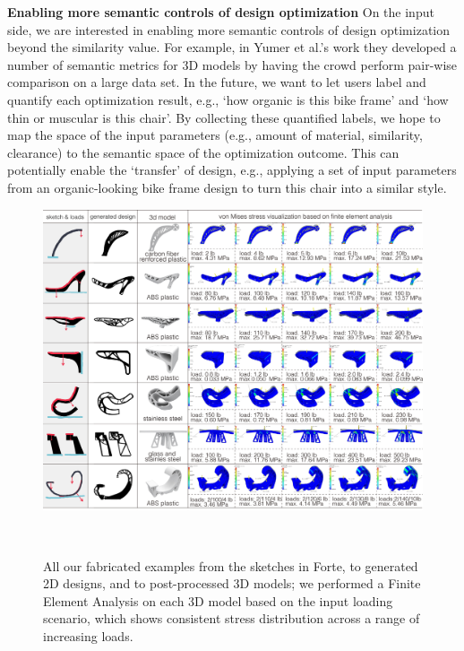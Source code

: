 \textbf{Enabling more semantic controls of design optimization}
On the input side, we are interested in enabling more semantic controls of design optimization beyond the similarity value. For example, in Yumer et al.'s work \cite{yumer2015semantic} they developed a number of semantic metrics for 3D models by having the crowd perform pair-wise comparison on a large data set. In the future, we want to let users label and quantify each optimization result, e.g., `how organic is this bike frame' and `how thin or muscular is this chair'. By collecting these quantified labels, we hope to map the space of the input parameters (e.g., amount of material, similarity, clearance) to the semantic space of the optimization outcome. This can potentially enable the `transfer' of design, e.g., applying a set of input parameters from an organic-looking bike frame design to turn this chair into a similar style.

\begin{figure} [h!]
  \centering
  \includegraphics[width=1\textwidth]{figures/results}
  \caption{All our fabricated examples from the sketches in Forte, to generated 2D designs, and to post-processed 3D models; we performed a Finite Element Analysis on each 3D model based on the input loading scenario, which shows consistent stress distribution across a range of increasing loads.}~\label{fig:results}
\end{figure}




